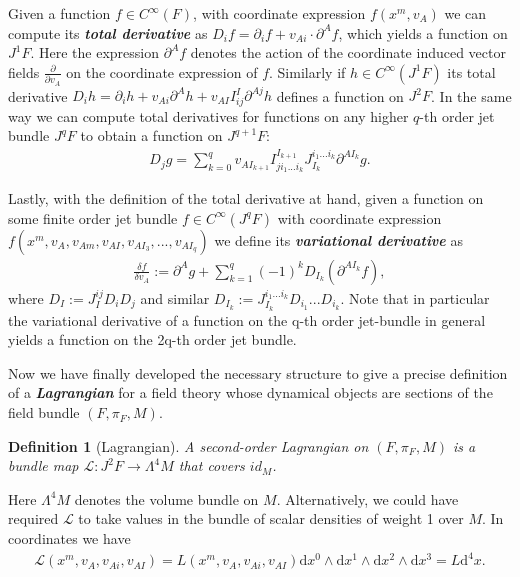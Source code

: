 \documentclass[a4paper,12pt, DIV=14, BCOR=5mm, twoside, headsepline, numbers=noenddot]{scrbook}
\newtheorem{definition}{Definition}[section]
\begin{document}
Given a function $f \in C^{\infty}(F)$, with coordinate expression $f(x^m, v_A)$ we can compute its \textit{\textbf{total derivative}} as $D_if = \partial_i f + v_{Ai}\cdot \partial^A f$, which yields a function on $J^1F$. Here the expression $\partial^A f$ denotes the action of the coordinate induced vector fields $\frac{\partial}{\partial v_A}$ on the coordinate expression of $f$. Similarly if $h \in C^{\infty}(J^1F)$ its total derivative $D_i h = \partial_i h + v_{Ai} \partial^A h + v_{AI}I^I_{ij} \partial ^{Aj} h$ defines a function on $J^2F$. In the same way we can compute total derivatives for functions on any higher $q$-th order jet bundle $J^qF$ to obtain a function on $J^{q+1}F$:
\begin{align}\label{totDer}
    D_j g = \sum _{k = 0}^{q}  v_{AI_{k+1}}I^{I_{k+1}}_{ji_1...i_k}J_{I_k}^{i_1...i_k}\partial^{AI_k} g.
\end{align}
 

Lastly, with the definition of the total derivative at hand, given a function on some finite order jet bundle $f \in C^{\infty}(J^qF)$ with coordinate expression $f(x^m,v_A,v_{Am},v_{AI},v_{AI_{3}},...,v_{AI_{q}})$ we define its \textit{\textbf{variational derivative}} as 
\begin{align}\label{varDer}
\frac{\delta f}{\delta v_A} := \partial^{A}g + \sum _{k = 1}^q (-1)^k D_{I_k}(\partial^{AI_k}f),
\end{align}
where $D_I := J_I ^{ij} D_i D_j$ and similar $D_{I_k} := J_{I_k}^{i_1...i_k} D_{i_1} ... D_{i_k}$.
Note that in particular the variational derivative of a function on the q-th order jet-bundle in general yields a function on the 2q-th order jet bundle.

Now we have finally developed the necessary structure to give a precise definition of a \textbf{\textit{Lagrangian}} for a field theory whose dynamical objects are sections of the field bundle $(F, \pi_F,M)$.
\begin{definition}[Lagrangian]
A second-order Lagrangian on $(F,\pi_F,M)$ is a bundle map $\mathcal{L} : J^2F \rightarrow \Lambda^4M$ that covers $id_M$.
\end{definition}
Here $\Lambda^4 M$ denotes the volume bundle on $M$. Alternatively, we could have required $\mathcal{L}$ to take values in the bundle of scalar densities of weight 1 over $M$. In coordinates we have 
\begin{align}
    \mathcal{L}(x^m,v_A,v_{Ai},v_{AI}) = L(x^m,v_A,v_{Ai},v_{AI}) \mathrm{d}x^0 \wedge \mathrm{d}x^1 \wedge \mathrm{d}x^2 \wedge \mathrm{d}x^3 = L \mathrm{d}^4x.
\end{align} 
\end{document}
